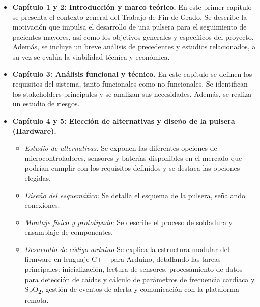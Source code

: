 \documentclass[12pt, a4paper]{article}
\begin{document}
	\begin{itemize}
		\item \textbf{Capítulo 1 y 2: Introducción y marco teórico.}  
		En este primer capítulo se presenta el contexto general del Trabajo de Fin de Grado. Se describe la motivación que impulsa el desarrollo de una pulsera para el seguimiento de pacientes mayores, así como los objetivos generales y específicos del proyecto. Además, se incluye un breve análisis de precedentes y estudios relacionados, a su vez se evalúa la viabilidad técnica y económica.
		
		\item \textbf{Capítulo 3: Análisis funcional y técnico.}  
		En este capítulo se definen los requisitos del sistema, tanto funcionales como no funcionales. Se identifican los stakeholders principales y se analizan sus necesidades. Además, se realiza un estudio de riesgos.
		
		\item \textbf{Capítulo 4 y 5: Elección de alternativas y diseño de la pulsera (Hardware).}  
		\begin{itemize}
			\item \emph{Estudio de alternativas:} Se exponen las diferentes opciones de microcontroladores, sensores y baterías disponibles en el mercado que podrían cumplir con los requisitos definidos y se destaca las opciones elegidas.
			\item \emph{Diseño del esquemático:} Se detalla el esquema de la pulsera, señalando conexiones.
			\item \emph{Montaje físico y prototipado:} Se describe el proceso de soldadura y ensamblaje de componentes.  
			\item \emph{Desarrollo de código arduino} Se explica la estructura modular del firmware en lenguaje C++ para Arduino, detallando las tareas principales: inicialización, lectura de sensores, procesamiento de datos para detección de caídas y cálculo de parámetros de frecuencia cardíaca y SpO\textsubscript{2}, gestión de eventos de alerta y comunicación con la plataforma remota.  
		\end{itemize}
		

\end{itemize}
\end{document}
